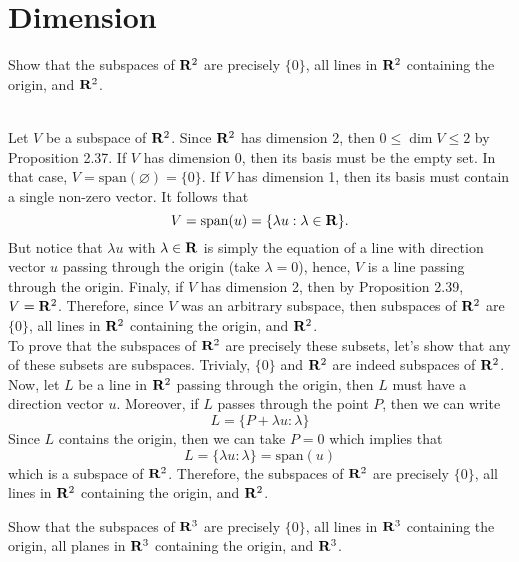 \section{Dimension}

\begin{exercise}
    Show that the subspaces of $\mathbf{R}^2$ are precisely $\{0\}$, all lines in $\mathbf{R}^2$ containing the origin, and $\mathbf{R}^2$. \\
\end{exercise}

\begin{solution}
    \\ Let $V$ be a subspace of $\mathbf{R}^2$. Since $\mathbf{R}^2$ has dimension 2, then $0 \leq \dim V \leq 2$ by Proposition 2.37. If $V$ has dimension 0, then its basis must be the empty set. In that case, $V = \text{span}(\varnothing) = \{0\}$. If $V$ has dimension 1, then its basis must contain a single non-zero vector. It follows that 
    $$V = \text{span}(u) = \{\lambda u : \lambda \in \mathbf{R}\}.$$
    But notice that $\lambda u$ with $\lambda \in \mathbf{R}$ is simply the equation of a line with direction vector $u$ passing through the origin (take $\lambda = 0$), hence, $V$ is a line passing through the origin. Finaly, if $V$ has dimension 2, then by Proposition 2.39, $V = \mathbf{R}^2$. Therefore, since $V$ was an arbitrary subspace, then subspaces of $\mathbf{R}^2$ are $\{0\}$, all lines in $\mathbf{R}^2$ containing the origin, and $\mathbf{R}^2$.\\
    To prove that the subspaces of $\mathbf{R}^2$ are precisely these subsets, let's show that any of these subsets are subspaces. Trivialy, $\{0\}$ and $\mathbf{R}^2$ are indeed subspaces of $\mathbf{R}^2$. Now, let $L$ be a line in $\mathbf{R}^2$ passing through the origin, then $L$ must have a direction vector $u$. Moreover, if $L$ passes through the point $P$, then we can write
    $$L = \{P + \lambda u : \lambda\}$$
    Since $L$ contains the origin, then we can take $P = 0$ which implies that
    $$L = \{\lambda u : \lambda\} = \text{span}(u)$$
    which is a subspace of $\mathbf{R}^2$. Therefore, the subspaces of $\mathbf{R}^2$ are precisely $\{0\}$, all lines in $\mathbf{R}^2$ containing the origin, and $\mathbf{R}^2$.\\
\end{solution}

\begin{exercise}
    Show that the subspaces of $\mathbf{R}^3$ are precisely $\{0\}$, all lines in $\mathbf{R}^3$ containing the origin, all planes in $\mathbf{R}^3$ containing the origin, and $\mathbf{R}^3$. \\
\end{exercise}

